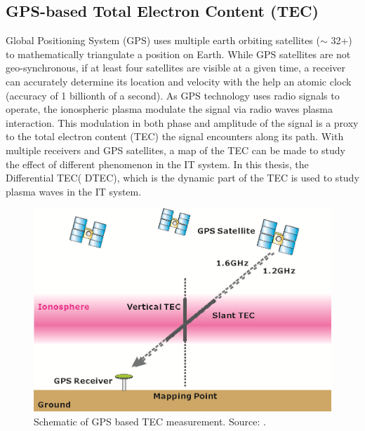 \documentclass[crop=false,class=mitthesis,oneside,font=12pt]{standalone}
\begin{document}
\subsection{GPS-based Total Electron Content (TEC)}
Global Positioning System (GPS) uses multiple earth orbiting satellites ($\sim$ 32+) to mathematically triangulate a position on Earth. While GPS satellites are not geo-synchronous, if at least four satellites are visible at a given time, a receiver can accurately determine its location and velocity with the help an atomic clock (accuracy of 1 billionth of a second). As GPS technology uses radio signals to operate, the ionospheric plasma modulate the signal via radio waves plasma interaction. This modulation in both phase and amplitude of the signal is a proxy to the total electron content (TEC) the signal encounters along its path. With multiple receivers and GPS satellites, a map of the TEC can be made to study the effect of different phenomenon in the IT system. In this thesis, the Differential TEC( DTEC), which is the dynamic part of the TEC is used to study plasma waves in the IT system.
\begin{figure}[H]
	\centering\includegraphics[width=30pc]{6-0.png}
	\caption{Schematic of GPS based TEC measurement. Source: \cite{tsugawa}.}
	\label{fig:gps}
\end{figure}
\end{document}
